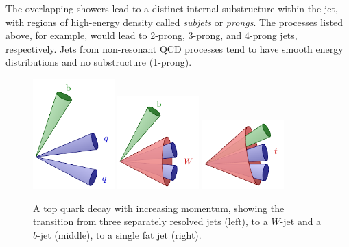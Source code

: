 The overlapping showers lead to a distinct internal substructure within the jet, with regions of high-energy density called \textit{subjets} or \textit{prongs}.
The processes listed above, for example, would lead to 2-prong, 3-prong, and 4-prong jets, respectively.
Jets from non-resonant QCD processes tend to have smooth energy distributions and no substructure (1-prong).

\begin{figure}[htb]
    \centering
    \includegraphics[width=0.28\textwidth]{Feynman/sep.pdf}
    \hfill
    \includegraphics[width=0.28\textwidth]{Feynman/W.pdf}
    \hfill
    \includegraphics[width=0.28\textwidth]{Feynman/top.pdf}
    \caption{A top quark decay with increasing momentum, showing the transition from three separately resolved jets (left), to a $W$-jet and a $b$-jet (middle), to a single fat jet (right).}
    \label{fig:jet_topologies}
\end{figure}

